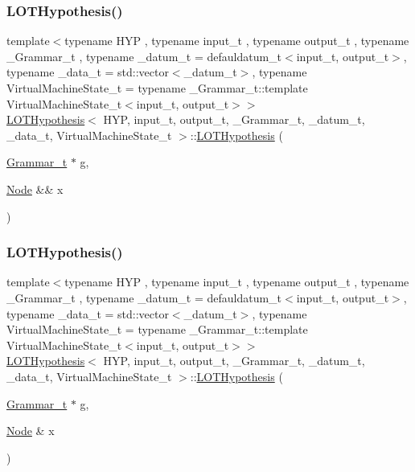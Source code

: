 \subsubsection{\texorpdfstring{L\+O\+T\+Hypothesis()}{LOTHypothesis()}\hspace{0.1cm}{\footnotesize\ttfamily [2/4]}}
{\footnotesize\ttfamily template$<$typename H\+YP , typename input\+\_\+t , typename output\+\_\+t , typename \+\_\+\+Grammar\+\_\+t , typename \+\_\+datum\+\_\+t  = defauldatum\+\_\+t$<$input\+\_\+t, output\+\_\+t$>$, typename \+\_\+data\+\_\+t  = std\+::vector$<$\+\_\+datum\+\_\+t$>$, typename Virtual\+Machine\+State\+\_\+t  = typename \+\_\+\+Grammar\+\_\+t\+::template Virtual\+Machine\+State\+\_\+t$<$input\+\_\+t, output\+\_\+t$>$$>$ \\
\hyperlink{class_l_o_t_hypothesis}{L\+O\+T\+Hypothesis}$<$ H\+YP, input\+\_\+t, output\+\_\+t, \+\_\+\+Grammar\+\_\+t, \+\_\+datum\+\_\+t, \+\_\+data\+\_\+t, Virtual\+Machine\+State\+\_\+t $>$\+::\hyperlink{class_l_o_t_hypothesis}{L\+O\+T\+Hypothesis} (\begin{DoxyParamCaption}\item[{\hyperlink{class_l_o_t_hypothesis_a8006204013d471860e54c49d19edbace}{Grammar\+\_\+t} $\ast$}]{g,  }\item[{\hyperlink{class_node}{Node} \&\&}]{x }\end{DoxyParamCaption})\hspace{0.3cm}{\ttfamily [inline]}}

\mbox{\label{class_l_o_t_hypothesis_a877ff1340bdf69fa2d9ed290c70f1cfb}} 
\subsubsection{\texorpdfstring{L\+O\+T\+Hypothesis()}{LOTHypothesis()}\hspace{0.1cm}{\footnotesize\ttfamily [3/4]}}
{\footnotesize\ttfamily template$<$typename H\+YP , typename input\+\_\+t , typename output\+\_\+t , typename \+\_\+\+Grammar\+\_\+t , typename \+\_\+datum\+\_\+t  = defauldatum\+\_\+t$<$input\+\_\+t, output\+\_\+t$>$, typename \+\_\+data\+\_\+t  = std\+::vector$<$\+\_\+datum\+\_\+t$>$, typename Virtual\+Machine\+State\+\_\+t  = typename \+\_\+\+Grammar\+\_\+t\+::template Virtual\+Machine\+State\+\_\+t$<$input\+\_\+t, output\+\_\+t$>$$>$ \\
\hyperlink{class_l_o_t_hypothesis}{L\+O\+T\+Hypothesis}$<$ H\+YP, input\+\_\+t, output\+\_\+t, \+\_\+\+Grammar\+\_\+t, \+\_\+datum\+\_\+t, \+\_\+data\+\_\+t, Virtual\+Machine\+State\+\_\+t $>$\+::\hyperlink{class_l_o_t_hypothesis}{L\+O\+T\+Hypothesis} (\begin{DoxyParamCaption}\item[{\hyperlink{class_l_o_t_hypothesis_a8006204013d471860e54c49d19edbace}{Grammar\+\_\+t} $\ast$}]{g,  }\item[{\hyperlink{class_node}{Node} \&}]{x }\end{DoxyParamCaption})\hspace{0.3cm}{\ttfamily [inline]}}

